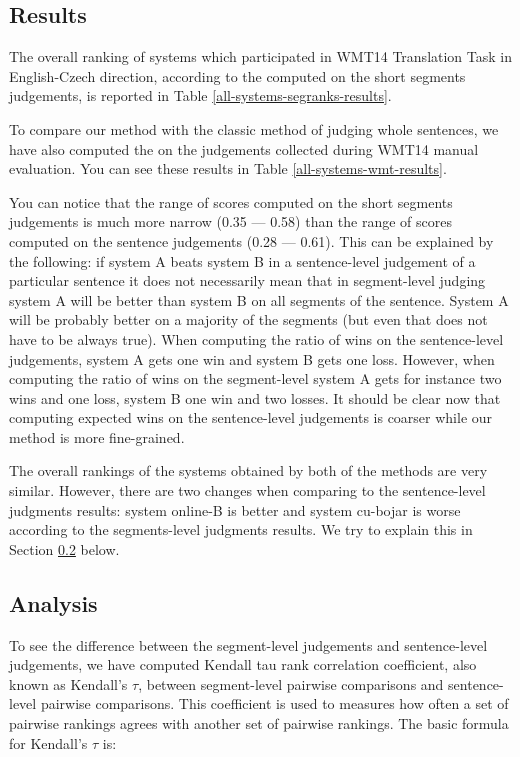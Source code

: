 \subsection{Results}

The overall ranking of systems which participated in WMT14 Translation Task in
English-Czech direction, according to the  computed on the short segments judgements, is reported in Table
\ref{all-systems-segranks-results}.

To compare our method with the classic method of judging whole sentences, we
have also computed the  on the judgements
collected during WMT14 manual evaluation. You can see these results in
Table \ref{all-systems-wmt-results}.

You can notice that the range of scores computed on the short segments
judgements is much more narrow (0.35 --- 0.58) than the range of scores computed
on the sentence judgements (0.28 --- 0.61). This can be explained by the
following: if system A beats system B in a sentence-level judgement of a
particular sentence it does not necessarily mean that in segment-level judging
system A will be better than system B on all segments of the sentence. System A
will be probably better on a majority of the segments (but even that does not
have to be always true). When computing the ratio of wins on the sentence-level
judgements, system A gets one win and system B gets one loss. However, when
computing the ratio of wins on the segment-level system A gets for instance two
wins and one loss, system B one win and two losses. It should be clear now that
computing expected wins on the sentence-level judgements is coarser while our
method is more fine-grained.

The overall rankings of the systems obtained by both of the methods are very
similar. However, there are two changes when comparing to the sentence-level
judgments results: system online-B is better and system cu-bojar is worse
according to the segments-level judgments results. We try to explain this in 
Section \ref{analysis} below.

\subsection{Analysis}
\label{analysis}

To see the difference between the segment-level judgements and sentence-level
judgements, we have computed Kendall tau rank correlation coefficient, also
known as Kendall's $\tau$, between segment-level pairwise comparisons and
sentence-level pairwise comparisons. This coefficient is used to measures how
often a set of pairwise rankings agrees with another set of pairwise rankings.
The basic formula for Kendall's $\tau$ is:

